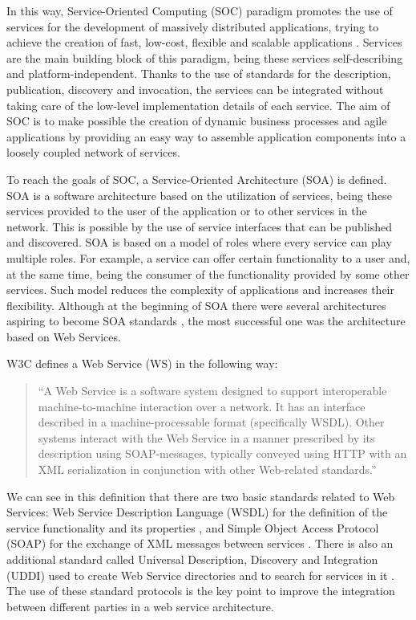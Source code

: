 In this way, Service-Oriented Computing (SOC) paradigm promotes the use of services 
for the development of massively distributed applications, trying to achieve the creation of fast, 
low-cost, flexible and scalable applications \cite{Papazoglou2007}. 
Services are the main building block of this paradigm, being these services self-describing and platform-independent. 
Thanks to the use of standards for the description, publication, discovery and invocation, 
the services can be integrated without taking care of the low-level implementation 
details of each service. The aim of SOC is to make possible 
the creation of dynamic business processes and agile applications 
by providing an easy way to assemble application components into a loosely coupled network of services.

To reach the goals of SOC, a Service-Oriented Architecture (SOA) is defined. 
SOA is a software architecture based on the utilization of services, 
being these services provided to the user of the application or to other services in the network. 
This is possible by the use of service interfaces that can be published and discovered. 
SOA is based on a model of roles where every service can play multiple roles. 
For example, a service can offer certain functionality to a user and, at the same time, 
being the consumer of the functionality provided by some other services. 
Such model reduces the complexity of applications and increases their flexibility. 
Although at the beginning of SOA there were several architectures aspiring 
to become SOA standards \cite{Karp2000,Sun1999}, the most successful one was the architecture based on Web Services.

W3C defines a Web Service (WS) in the following way:

\begin{quotation}
	``A Web Service is a software system designed to support interoperable machine-to-machine interaction over a network. It has
an interface described in a machine-processable format (specifically WSDL). Other systems interact with the Web Service in a manner prescribed by its description using SOAP-messages, typically conveyed using HTTP with an XML serialization in conjunction with other Web-related standards.''
\end{quotation}

We can see in this definition that there are two basic standards 
related to Web Services: Web Service Description Language (WSDL) for the definition 
of the service functionality and its properties \cite{W3C2001}, 
and Simple Object Access Protocol (SOAP) for the exchange of 
XML messages between services \cite{W3C2007}. 
There is also an additional standard called Universal Description, Discovery and Integration (UDDI) 
used to create Web Service directories and to search for services 
in it \cite{OASIS2004}. The use of these standard protocols is 
the key point to improve the integration between different parties in a web service architecture.


